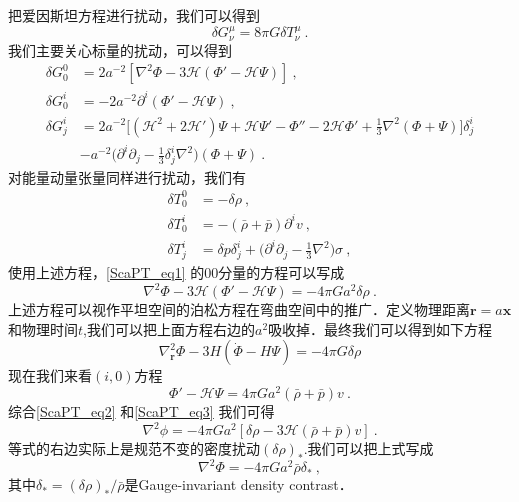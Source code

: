 把爱因斯坦方程进行扰动，我们可以得到
\begin{equation}\label{ScaPT_eq1}
\delta G^\mu_\nu = 8 \pi G\delta T^\mu_\nu ~.
\end{equation}
我们主要关心标量的扰动，可以得到
\begin{equation}
\begin{aligned}
\delta G^0_0 & = 2 a^{-2} [\nabla^2 \Phi- 3 \mathcal H(\Phi' - \mathcal H \Psi)] ~,  \\
\delta G^i_0 & = - 2 a^{-2} \partial^i(\Phi' - \mathcal H \Psi)~, \\
\delta G^i_j &= 2 a^{-2} \bigg[ (\mathcal H^2 + 2 \mathcal H')\Psi +\mathcal H \Psi' - \Phi'' - 2 \mathcal H \Phi' + \frac{1}{3} \nabla^2 (\Phi+\Psi)  \bigg] \delta^i_j \\
& - a^{-2} \bigg( \partial^i\partial_j - \frac{1}{3} \delta^i_j \nabla^2 \bigg) (\Phi+\Psi) ~.
\end{aligned}
\end{equation}
对能量动量张量同样进行扰动，我们有
\begin{equation}
\begin{aligned}
\delta T^0_0 & = - \delta \rho~, \\
\delta T^i_0 & = - (\bar \rho +\bar p) \partial^i v~, \\
\delta T^i_j & = \delta p \delta^i_j + \bigg( \partial^i\partial_j - \frac{1}{3} \nabla^2 \bigg) \sigma ~,
\end{aligned}
\end{equation}
使用上述方程，\autoref{ScaPT_eq1} 的00分量的方程可以写成
\begin{equation}\label{ScaPT_eq2}
\nabla^2 \Phi - 3 \mathcal H (\Phi' - \mathcal H\Psi) = - 4 \pi G a^2 \delta \rho~. 
\end{equation}
上述方程可以视作平坦空间的泊松方程在弯曲空间中的推广．定义物理距离$\mathbf r = a \mathbf x$和物理时间$t$,我们可以把上面方程右边的$a^2$吸收掉．最终我们可以得到如下方程
\begin{equation}
\nabla^2_{\mathbf r} \Phi - 3 H (\dot\Phi - H \Psi) = - 4 \pi G \delta \rho
\end{equation}
现在我们来看$(i,0)$方程
\begin{equation}\label{ScaPT_eq3}
\Phi' - \mathcal H \Psi = 4 \pi G a^2 (\bar \rho + \bar p) v ~.
\end{equation}
综合\autoref{ScaPT_eq2} 和\autoref{ScaPT_eq3} 我们可得
\begin{equation}
\nabla^2\phi = - 4 \pi G a^2 [\delta \rho - 3 \mathcal H(\bar\rho+ \bar p) v]~.
\end{equation}
等式的右边实际上是规范不变的密度扰动$(\delta\rho)_*$.我们可以把上式写成
\begin{equation}
\nabla^2\Phi = - 4 \pi G a^2 \bar \rho \delta_* ~,
\end{equation}
其中$\delta_* = (\delta \rho)_*/\bar \rho$是Gauge-invariant density contrast．

